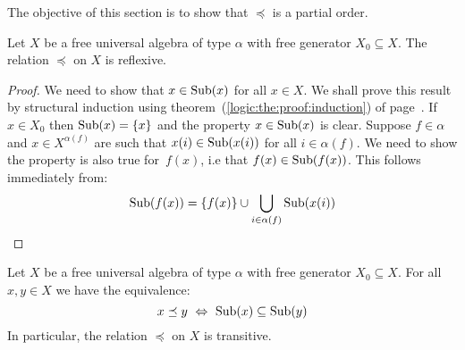 The objective of this section is to show that $\preceq$ is a partial
order.

\begin{prop}\label{logic:prop:subformula:reflexive}
Let $X$ be a free universal algebra of type $\alpha$ with free
generator $X_{0}\subseteq X$. The relation $\preceq$ on $X$ is
reflexive.
\end{prop}
\begin{proof}
We need to show that $x\in\mbox{\rm Sub}(x)$ for all $x\in X$. We shall prove
this result by structural induction using
theorem~(\ref{logic:the:proof:induction}) of
page~\pageref{logic:the:proof:induction}. If $x\in X_{0}$ then
$\mbox{\rm Sub}(x)=\{x\}$ and the property $x\in\mbox{\rm Sub}(x)$ is clear. Suppose
$f\in\alpha$ and $x\in X^{\alpha(f)}$ are such that
$x(i)\in\mbox{\rm Sub}(x(i))$ for all $i\in\alpha(f)$. We need to show the
property is also true for~$f(x)$, i.e that $f(x)\in\mbox{\rm Sub}(f(x))$.
This follows immediately from:
    \[
    \mbox{\rm Sub}(f(x)) = \{f(x)\}\cup\bigcup_{i\in\alpha(f)}\mbox{\rm Sub}(x(i))
    \]
\end{proof}
\begin{prop}\label{logic:prop:subformula:transitive}
Let $X$ be a free universal algebra of type $\alpha$ with free
generator $X_{0}\subseteq X$. For all $x,y\in X$ we have the
equivalence:
    \[
    x\preceq y\ \Leftrightarrow\ \subf(x)\subseteq\subf(y)
    \]
In particular, the relation $\preceq$ on $X$ is transitive.
\end{prop}
